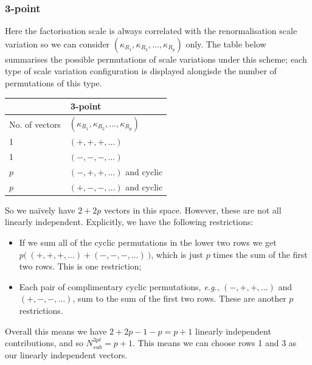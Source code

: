 \subsubsection{3-point}
Here the factorisation scale is always correlated with the renormalisation scale variation so we can consider  $(\kappa_{R_1}, \kappa_{R_2}, \dots , \kappa_{R_p})$ only. The table below summarises the possible permutations of scale variations under this scheme; each type of scale variation configuration is displayed alongisde the number of permutations of this type.
\begin{center}
\begin{tabular}{ |p{3cm}|p{6cm}|  }
\hline
\multicolumn{2}{|c|}{3-point} \\
\hline
No. of vectors & $(\kappa_{R_1}, \kappa_{R_2}, \dots , \kappa_{R_p})\ $  \\
\hline
1 & $(+, +, +, \dots)$ \\
1 & $(-, -, -, \dots)$   \\
$p$ & $(-, +, +, \dots)$ and cyclic\\
$p$    & $(+, -, -, \dots)$ and cyclic \\
\hline
\end{tabular}
\end{center}
So we na\"ively have $2+2p$ vectors in this space. However, these are not all linearly independent. Explicitly, we have the following restrictions:
\begin{itemize}
\item If we sum all of the cyclic permutations in the lower two rows we get $p \big(\ (+, +, +, \dots) + (-, -, -, \dots)\ \big)$, which is just $p$ times the sum of the first two rows. This is one restriction;
\item Each pair of complimentary cyclic permutations, \textit{e.g.}, $(-, +, +, \dots)$ and $(+, -, -, \dots)$, sum to the sum of the first two rows. These are another $p$ restrictions.
\end{itemize}
Overall this means we have $2+2p-1-p=p+1$ linearly independent contributions, and so $N_{sub}^{3pt} = p+1$. This means we can choose rows 1 and 3 as our linearly independent vectors.


